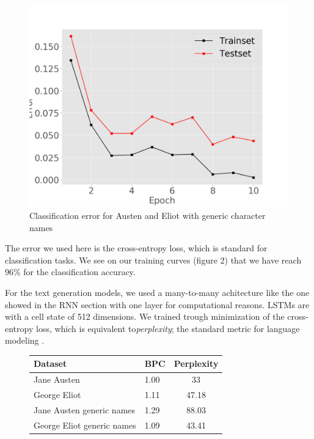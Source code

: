 \begin{figure}[ht]
\vskip 0.2in
\begin{center}
\centerline{\includegraphics[width=\columnwidth]{gejaclasswithout}}
\caption{Classification error for Austen and Eliot with generic character names}
\end{center}
\vskip -0.2in
\end{figure}
The error we used here is the cross-entropy loss, which is standard for 
classification tasks. We see on our training curves (figure 2) that we 
have reach 96\% for the classification accuracy.

\vspace{0.2in} 

For the text generation models, we used a many-to-many achitecture like 
the one showed in the RNN section with one layer for computational reasons.
LSTMs are with a cell state of 512 dimensions. We trained trough minimization 
of the cross-entropy loss, which is equivalent to\textit{perplexity}; the 
standard metric for language modeling \cite{gravesGenerating}.

\begin{figure}[htbp!]
\begin{tabular}{|l|l|c|}
\hline
Dataset & BPC & Perplexity \\
\hline
Jane Austen & 1.00 & 33 \\
George Eliot& 1.11 & 47.18 \\
Jane Austen generic names & 1.29  & 88.03 \\
George Eliot generic names & 1.09 & 43.41\\
\hline
\end{tabular}
\end{figure}



